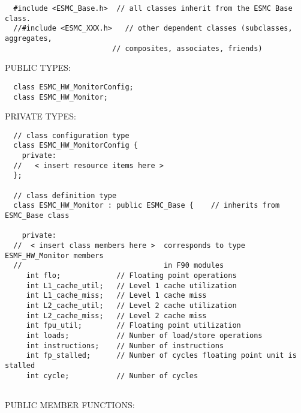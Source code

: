 \begin{verbatim}  #include <ESMC_Base.h>  // all classes inherit from the ESMC Base class.
  //#include <ESMC_XXX.h>   // other dependent classes (subclasses, aggregates,
                         // composites, associates, friends)
 \end{verbatim}{\sf PUBLIC TYPES:}
\begin{verbatim}  class ESMC_HW_MonitorConfig;
  class ESMC_HW_Monitor;
 \end{verbatim}{\sf PRIVATE TYPES:}
\begin{verbatim} 
  // class configuration type
  class ESMC_HW_MonitorConfig {
    private:
  //   < insert resource items here >
  };
 
  // class definition type
  class ESMC_HW_Monitor : public ESMC_Base {    // inherits from ESMC_Base class
 
    private:
  //  < insert class members here >  corresponds to type ESMF_HW_Monitor members
  //                                 in F90 modules
     int flo;             // Floating point operations
     int L1_cache_util;   // Level 1 cache utilization
     int L1_cache_miss;   // Level 1 cache miss
     int L2_cache_util;   // Level 2 cache utilization
     int L2_cache_miss;   // Level 2 cache miss
     int fpu_util;        // Floating point utilization
     int loads;           // Number of load/store operations
     int instructions;    // Number of instructions
     int fp_stalled;      // Number of cycles floating point unit is stalled
     int cycle;           // Number of cycles
 
 \end{verbatim}{\sf PUBLIC MEMBER FUNCTIONS:}
